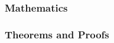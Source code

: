 \begin{frame}
\frametitle{Mathematics}
    
\end{frame}


\begin{frame}
\frametitle{Theorems and Proofs}
    
\end{frame}